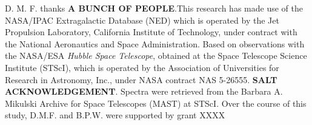 \documentclass[twocolumn,tighten]{aastex62}
\begin{document}




\acknowledgements

D. M. F. thanks \textbf{A BUNCH OF PEOPLE}.This research has made use of the NASA/IPAC Extragalactic Database (NED) which is operated by the Jet Propulsion Laboratory, California Institute of Technology, under contract with the National Aeronautics and Space Administration. Based on observations with the NASA/ESA \textit{Hubble Space Telescope}, obtained at the Space Telescope Science Institute (STScI), which is operated by the Association of Universities for Research in Astronomy, Inc., under NASA contract NAS 5-26555. \textbf{SALT ACKNOWLEDGEMENT}. Spectra were retrieved from the Barbara A. Mikulski Archive for Space Telescopes (MAST) at STScI. Over the course of this study, D.M.F. and B.P.W. were supported by grant XXXX


\clearpage

%
{}


\clearpage

\appendix
\end{document}
